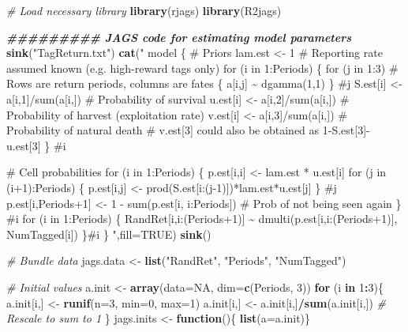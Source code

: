 \documentclass[
]{krantz}
\makeatletter
\newenvironment{Shaded}{\begin{snugshade}}{\end{snugshade}}
\newcommand{\AttributeTok}[1]{\textcolor[rgb]{0.27,0.27,0.27}{#1}}
\newcommand{\CommentTok}[1]{\textcolor[rgb]{0.37,0.37,0.37}{\textit{#1}}}
\newcommand{\ConstantTok}[1]{\textcolor[rgb]{0.37,0.37,0.37}{#1}}
\newcommand{\ControlFlowTok}[1]{\textcolor[rgb]{0.27,0.27,0.27}{\textbf{#1}}}
\newcommand{\DecValTok}[1]{\textcolor[rgb]{0.06,0.06,0.06}{#1}}
\newcommand{\DocumentationTok}[1]{\textcolor[rgb]{0.37,0.37,0.37}{\textbf{\textit{#1}}}}
\newcommand{\FunctionTok}[1]{\textcolor[rgb]{0.27,0.27,0.27}{\textbf{#1}}}
\newcommand{\NormalTok}[1]{#1}
\newcommand{\OtherTok}[1]{\textcolor[rgb]{0.37,0.37,0.37}{#1}}
\newcommand{\SpecialCharTok}[1]{\textcolor[rgb]{0.43,0.43,0.43}{\textbf{#1}}}
\newcommand{\StringTok}[1]{\textcolor[rgb]{0.5,0.5,0.5}{#1}}
\newenvironment{kframe}{%
\medskip{}
\setlength{\fboxsep}{.8em}
 \def\at@end@of@kframe{}%
 \ifinner\ifhmode%
  \def\at@end@of@kframe{\end{minipage}}%
  \begin{minipage}{\columnwidth}%
 \fi\fi%
 \def\FrameCommand##1{\hskip\@totalleftmargin \hskip-\fboxsep
 \colorbox{shadecolor}{##1}\hskip-\fboxsep
     \hskip-\linewidth \hskip-\@totalleftmargin \hskip\columnwidth}%
 \MakeFramed {\advance\hsize-\width
   \@totalleftmargin\z@ \linewidth\hsize
   \@setminipage}}%
 {\par\unskip\endMakeFramed%
 \at@end@of@kframe}
\renewenvironment{Shaded}{\begin{kframe}}{\end{kframe}}
\makeatother
\begin{document}
\begin{Shaded}
\begin{Highlighting}[]
\CommentTok{\# Load necessary library}
\FunctionTok{library}\NormalTok{(rjags)}
\FunctionTok{library}\NormalTok{(R2jags)}

  \DocumentationTok{\#\#\#\#\#\#\#\#\# JAGS code for estimating model parameters}
  \FunctionTok{sink}\NormalTok{(}\StringTok{"TagReturn.txt"}\NormalTok{)}
  \FunctionTok{cat}\NormalTok{(}\StringTok{"}
\StringTok{  model \{}
\StringTok{  \# Priors}
\StringTok{  lam.est \textless{}{-} 1 \# Reporting rate assumed known (e.g. high{-}reward tags only)}
\StringTok{  for (i in 1:Periods) \{}
\StringTok{     for (j in 1:3) \# Rows are return periods, columns are fates}
\StringTok{       \{}
\StringTok{         a[i,j] \textasciitilde{} dgamma(1,1)}
\StringTok{       \} \#j}
\StringTok{     S.est[i] \textless{}{-} a[i,1]/sum(a[i,]) \# Probability of survival}
\StringTok{     u.est[i] \textless{}{-} a[i,2]/sum(a[i,]) \# Probability of harvest (exploitation rate)}
\StringTok{     v.est[i] \textless{}{-} a[i,3]/sum(a[i,]) \# Probability of natural death}
\StringTok{     \# v.est[3] could also be obtained as 1{-}S.est[3]{-}u.est[3]}
\StringTok{  \} \#i}

\StringTok{\# Cell probabilities}
\StringTok{  for (i in 1:Periods) \{}
\StringTok{    p.est[i,i] \textless{}{-} lam.est * u.est[i]}
\StringTok{    for (j in (i+1):Periods) \{}
\StringTok{      p.est[i,j] \textless{}{-} prod(S.est[i:(j{-}1)])*lam.est*u.est[j]}
\StringTok{      \} \#j}
\StringTok{    p.est[i,Periods+1] \textless{}{-} 1 {-} sum(p.est[i, i:Periods])   \# Prob of not being seen again}
\StringTok{    \} \#i}
\StringTok{  for (i in 1:Periods) \{}
\StringTok{  RandRet[i,i:(Periods+1)] \textasciitilde{} dmulti(p.est[i,i:(Periods+1)], NumTagged[i])}
\StringTok{  \}\#i}
\StringTok{ \}}
\StringTok{  "}\NormalTok{,}\AttributeTok{fill=}\ConstantTok{TRUE}\NormalTok{)}
  \FunctionTok{sink}\NormalTok{()}

\CommentTok{\# Bundle data}
\NormalTok{  jags.data }\OtherTok{\textless{}{-}} \FunctionTok{list}\NormalTok{(}\StringTok{"RandRet"}\NormalTok{, }\StringTok{"Periods"}\NormalTok{, }\StringTok{"NumTagged"}\NormalTok{)}

\CommentTok{\# Initial values}
\NormalTok{  a.init }\OtherTok{\textless{}{-}} \FunctionTok{array}\NormalTok{(}\AttributeTok{data=}\ConstantTok{NA}\NormalTok{, }\AttributeTok{dim=}\FunctionTok{c}\NormalTok{(Periods, }\DecValTok{3}\NormalTok{))}
  \ControlFlowTok{for}\NormalTok{ (i }\ControlFlowTok{in} \DecValTok{1}\SpecialCharTok{:}\DecValTok{3}\NormalTok{)\{}
\NormalTok{    a.init[i,] }\OtherTok{\textless{}{-}} \FunctionTok{runif}\NormalTok{(}\AttributeTok{n=}\DecValTok{3}\NormalTok{, }\AttributeTok{min=}\DecValTok{0}\NormalTok{, }\AttributeTok{max=}\DecValTok{1}\NormalTok{)}
\NormalTok{    a.init[i,] }\OtherTok{\textless{}{-}}\NormalTok{ a.init[i,]}\SpecialCharTok{/}\FunctionTok{sum}\NormalTok{(a.init[i,]) }\CommentTok{\# Rescale to sum to 1}
\NormalTok{  \}}
\NormalTok{  jags.inits }\OtherTok{\textless{}{-}} \ControlFlowTok{function}\NormalTok{()\{ }\FunctionTok{list}\NormalTok{(}\AttributeTok{a=}\NormalTok{a.init)\}}


\end{Highlighting}
\end{Shaded}
\end{document}
